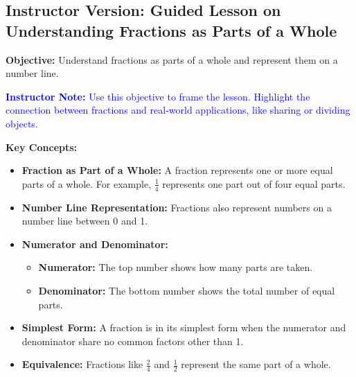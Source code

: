\documentclass[12pt]{article}
\title{}
\date{}
\begin{document}
\subsection*{Instructor Version: Guided Lesson on Understanding Fractions as Parts of a Whole}
\onehalfspacing

\begin{tcolorbox}[colframe=black!40, colback=gray!5, 
coltitle=black, colbacktitle=black!20, fonttitle=\bfseries\Large, 
title=Learning Objective, halign title=center, left=5pt, right=5pt, top=5pt, bottom=15pt]
\textbf{Objective:} Understand fractions as parts of a whole and represent them on a number line.
\end{tcolorbox}

\textcolor{blue}{\textbf{Instructor Note:} Use this objective to frame the lesson. Highlight the connection between fractions and real-world applications, like sharing or dividing objects.}

\vspace{1em}

\begin{tcolorbox}[colframe=black!60, colback=white, 
coltitle=black, colbacktitle=black!15, fonttitle=\bfseries\Large, 
title=Key Concepts and Vocabulary, halign title=center, left=10pt, right=10pt, top=10pt, bottom=15pt]
\textbf{Key Concepts:}
\begin{itemize}
    \item \textbf{Fraction as Part of a Whole:} A fraction represents one or more equal parts of a whole. For example, \( \frac{1}{4} \) represents one part out of four equal parts.
    \item \textbf{Number Line Representation:} Fractions also represent numbers on a number line between 0 and 1. 
    \item \textbf{Numerator and Denominator:}
    \begin{itemize}
        \item \textbf{Numerator:} The top number shows how many parts are taken.
        \item \textbf{Denominator:} The bottom number shows the total number of equal parts.
    \end{itemize}
    \item \textbf{Simplest Form:} A fraction is in its simplest form when the numerator and denominator share no common factors other than 1.
    \item \textbf{Equivalence:} Fractions like \( \frac{2}{4} \) and \( \frac{1}{2} \) represent the same part of a whole.
\end{itemize}
\end{tcolorbox}
\end{document}
